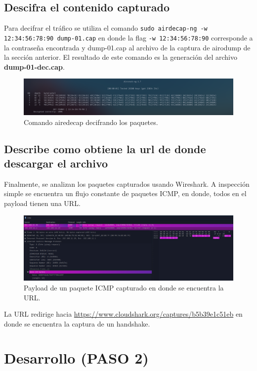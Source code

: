 \documentclass[letter,12pt]{article}
\newcommand{\code}[1]{\colorbox{lightgray!80}{\lstinline[breaklines=true]|#1|}}
\begin{document}
\subsection{Descifra el contenido capturado}
Para decifrar el tráfico se utiliza el comando \code{sudo airdecap-ng -w
12:34:56:78:90 dump-01.cap} en donde la flag \code{-w 12:34:56:78:90}
corresponde a la contraseña encontrada y dump-01.cap al archivo de la captura de
airodump de la sección anterior. El resultado de este comando es la generación
del  archivo \textbf{dump-01-dec.cap}.

\begin{figure}[H]
  \centering
  \includegraphics[width=16cm]{images/05-decrypted.png}
  \caption{Comando airedecap decifrando los paquetes.}
\end{figure}

\subsection{Describe como obtiene la url de donde descargar el archivo}
Finalmente, se analizan los paquetes capturados usando Wireshark. A inspección
simple se encuentra un flujo constante de paquetes ICMP, en donde, todos en el
payload tienen una URL.

\begin{figure}[H]
  \centering
  \includegraphics[width=16cm]{images/06-wireshark.png}
  \caption{Payload de un paquete ICMP capturado en donde se encuentra la URL.}
\end{figure}

La URL redirige hacia \url{https://www.cloudshark.org/captures/b5b39e1c51eb} en
donde se encuentra la captura de un handshake.

\section{Desarrollo (PASO 2)}
\end{document}
